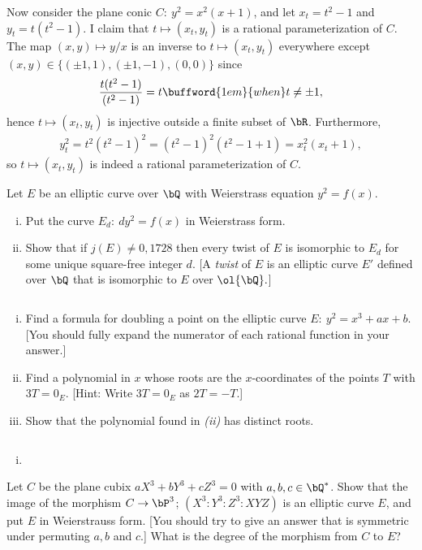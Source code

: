 \begin{homework}[e]
\begin{prf}
		Now consider the plane conic $C: ~ y^2 = x^2(x+1)$, and let $x_t = t^2 - 1$ and $y_t = t(t^2 - 1)$. I claim that $t \mapsto (x_t,y_t)$ is a rational parameterization of $C$. The map $(x,y) \mapsto y/x$ is an inverse to $t\mapsto (x_t,y_t)$ everywhere except $(x,y) \in \{(\pm 1, 1), (\pm 1, -1), (0,0)\}$ since
		\begin{align*}
			\frac{t(t^2 - 1)}{(t^2 - 1)} = t \buffword{1em}{when} t \neq \pm 1,
		\end{align*}
		hence $t \mapsto (x_t,y_t)$ is injective outside a finite subset of $\bR$. Furthermore,
		\begin{align*}
			y_t^2 = t^2(t^2 - 1)^2 = (t^2-1)^2(t^2 - 1 + 1) = x_t^2(x_t + 1),
		\end{align*}
		so $t \mapsto (x_t, y_t)$ is indeed a rational parameterization of $C$.
	\end{prf}

	 Let $E$ be an elliptic curve over $\bQ$ with Weierstrass equation $y^2 = f(x)$.
	\begin{enumerate}[(i)]
		\item Put the curve $E_d: ~ dy^2 = f(x)$ in Weierstrass form.
		\item Show that if $j(E) \neq 0, 1728$ then every twist of $E$ is isomorphic to $E_d$ for some unique square-free integer $d$. [A \emph{twist} of $E$ is an elliptic curve $E'$ defined over $\bQ$ that is isomorphic to $E$ over $\ol{\bQ}.$]
	\end{enumerate}

	$ $
	\begin{enumerate}[(i)]
		\item Find a formula for doubling a point on the elliptic curve $E:~y^2 = x^3 + ax + b.$ [You should fully expand the numerator of each rational function in your answer.]
		\item Find a polynomial in $x$ whose roots are the $x$-coordinates of the points $T$ with $3T = 0_E$. [Hint: Write $3T = 0_E$ as $2T = -T$.]
		\item Show that the polynomial found in \emph{(ii)} has distinct roots.
	\end{enumerate}
	\begin{prf}$ $
		\begin{enumerate}[(i)]
			\item 
		\end{enumerate}
	\end{prf}
	 Let $C$ be the plane cubix $aX^3 + bY^3 + cZ^3 = 0$ with $a,b,c \in \bQ^*$. Show that the image of the morphism $C \to \bP^3$; $(X^3: Y^3 : Z^3 : XYZ)$ is an elliptic curve $E$, and put  $E$ in Weierstrauss form. [You should try to give an answer that is symmetric under permuting $a,b$ and $c$.] What is the degree of the morphism from $C$ to $E$?
\end{homework}


